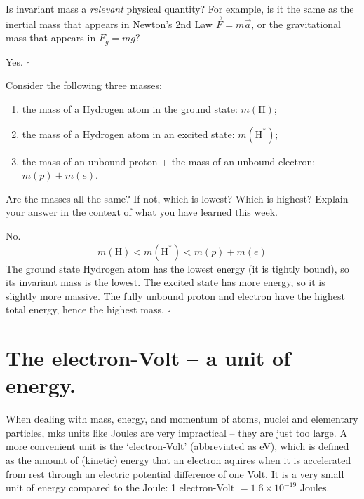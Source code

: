 \documentclass[11pt, letterpaper, openany]{book}
\newenvironment{exercise}[1][Exercise]{%
  \tcolorbox[blanker, breakable, left=1em,
    before skip=1em, after skip=1em,
    borderline west={3pt}{0pt}{PhysNavy},
    colback=PhysCream,
    before upper={\textcolor{PhysNavy}{\sffamily\bfseries #1:}\space}
  ]%
}{%
  \endtcolorbox%
}
\newenvironment{solution}[1][Solution]{%
  \tcolorbox[blanker, breakable, left=1em,
    before skip=1em, after skip=1em,
    borderline west={2pt}{0pt}{PhysTeal},
    colback=PhysCream,
    before upper={\textcolor{PhysTeal}{\sffamily\bfseries #1.}\space}
  ]%
}{%
  \hfill\textcolor{PhysTeal}{\ensuremath{\square}}\endtcolorbox%
}
\begin{document}
\begin{exercise}[Exercise 5]
Is invariant mass a \textit{relevant} physical quantity? For example, is it the same as the inertial mass that appears in Newton's 2nd Law $\vec{F} = m\vec{a}$, or the gravitational mass that appears in $F_g = mg$?
\end{exercise}
\begin{solution}
Yes.
\end{solution}

\begin{exercise}[Exercise 6]
Consider the following three masses:
\begin{enumerate}[label=(\roman*)]
    \item the mass of a Hydrogen atom in the ground state: $m(\text{H})$;
    \item the mass of a Hydrogen atom in an excited state: $m(\text{H}^*)$;
    \item the mass of an unbound proton + the mass of an unbound electron: $m(p) + m(e)$.
\end{enumerate}
Are the masses all the same? If not, which is lowest? Which is highest? Explain your answer in the context of what you have learned this week.
\end{exercise}
\begin{solution}
No.
\[ m(\text{H}) < m(\text{H}^*) < m(p) + m(e) \]
The ground state Hydrogen atom has the lowest energy (it is tightly bound), so its invariant mass is the lowest. The excited state has more energy, so it is slightly more massive. The fully unbound proton and electron have the highest total energy, hence the highest mass.
\end{solution}

\section{The electron-Volt -- a unit of energy.}

When dealing with mass, energy, and momentum of atoms, nuclei and elementary particles, mks units like Joules are very impractical -- they are just too large. A more convenient unit is the `electron-Volt' (abbreviated as eV), which is defined as the amount of (kinetic) energy that an electron aquires when it is accelerated from rest through an electric potential difference of one Volt. It is a very small unit of energy compared to the Joule: 1 electron-Volt $= 1.6 \times 10^{-19}$ Joules.
\end{document}
